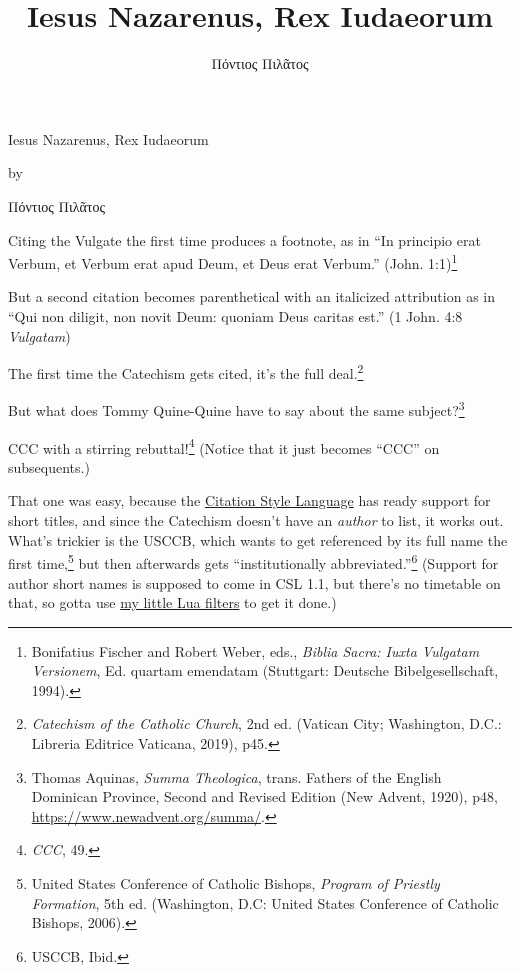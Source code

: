 \documentclass[
    12pt,
    letterpaper,
    oneside,
    noraggedright
]{turabian-researchpaper}
\title{{Iesus Nazarenus, Rex Iudaeorum}}
\author{{Πόντιος Πιλᾶτος}}
\begin{document}
    \begin{center}

    \thispagestyle{empty}
    \vspace*{1in}
    \begin{singlespace}
        {Iesus Nazarenus, Rex Iudaeorum}
        \end{singlespace}
    \vspace{2in - \baselineskip}

    by
    \vspace{2in - \baselineskip}

    {Πόντιος Πιλᾶτος}

    \vspace{2in - \baselineskip}

    \end{center}
    \newpage
    \setcounter{page}{1}

Citing the Vulgate the first time produces a footnote, as in ``In
principio erat Verbum, et Verbum erat apud Deum, et Deus erat Verbum.''
{(John. 1:1)\footnote{Bonifatius Fischer and Robert Weber, eds.,
  \emph{Biblia Sacra: Iuxta Vulgatam Versionem}, Ed. quartam emendatam
  (Stuttgart: Deutsche Bibelgesellschaft, 1994).}}

But a second citation becomes parenthetical with an italicized
attribution as in ``Qui non diligit, non novit Deum: quoniam Deus
caritas est.'' {(1 John. 4:8{ \emph{Vulgatam}})}

The first time the Catechism gets cited, it's the full deal.\footnote{\emph{Catechism
  of the Catholic Church}, 2nd ed. (Vatican City; Washington, D.C.:
  Libreria Editrice Vaticana, 2019), p45.}

But what does Tommy Quine-Quine have to say about the same
subject?\footnote{Thomas Aquinas, \emph{Summa Theologica}, trans.
  Fathers of the English Dominican Province, Second and Revised Edition
  (New Advent, 1920), p48, \url{https://www.newadvent.org/summa/}.}

CCC with a stirring rebuttal!\footnote{\emph{CCC}, 49.} (Notice that it
just becomes ``CCC'' on subsequents.)

That one was easy, because the
\href{https://citationstyles.org/}{Citation Style Language} has ready
support for short titles, and since the Catechism doesn't have an
\emph{author} to list, it works out. What's trickier is the USCCB, which
wants to get referenced by its full name the first time,\footnote{United
  States Conference of Catholic Bishops, \emph{Program of Priestly
  Formation}, 5th ed. (Washington, D.C: United States Conference of
  Catholic Bishops, 2006).} but then afterwards gets ``institutionally
abbreviated.''\footnote{USCCB, Ibid.} (Support for author short names is
supposed to come in CSL 1.1, but there's no timetable on that, so gotta
use
\href{https://github.com/sjml/paper/tree/main/paper/resources/project_template/.paper_resources/filters}{my
little Lua filters} to get it done.)
\end{document}
